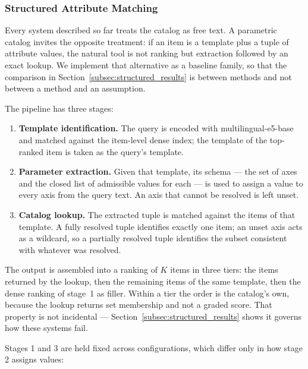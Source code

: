 \documentclass[preprint,12pt]{elsarticle}
\begin{document}
\subsubsection{Structured Attribute Matching}
\label{subsec:structured}

Every system described so far treats the catalog as free text. A parametric catalog invites the opposite treatment: if an item is a template plus a tuple of attribute values, the natural tool is not ranking but extraction followed by an exact lookup. We implement that alternative as a baseline family, so that the comparison in Section~\ref{subsec:structured_results} is between methods and not between a method and an assumption.

The pipeline has three stages:

\begin{enumerate}
    \item \textbf{Template identification.} The query is encoded with multilingual-e5-base and matched against the item-level dense index; the template of the top-ranked item is taken as the query's template.
    \item \textbf{Parameter extraction.} Given that template, its schema --- the set of axes and the closed list of admissible values for each --- is used to assign a value to every axis from the query text. An axis that cannot be resolved is left unset.
    \item \textbf{Catalog lookup.} The extracted tuple is matched against the items of that template. A fully resolved tuple identifies exactly one item; an unset axis acts as a wildcard, so a partially resolved tuple identifies the subset consistent with whatever was resolved.
\end{enumerate}

The output is assembled into a ranking of $K$ items in three tiers: the items returned by the lookup, then the remaining items of the same template, then the dense ranking of stage~1 as filler. Within a tier the order is the catalog's own, because the lookup returns set membership and not a graded score. That property is not incidental --- Section~\ref{subsec:structured_results} shows it governs how these systems fail.

Stages 1 and 3 are held fixed across configurations, which differ only in how stage 2 assigns values:
\end{document}

